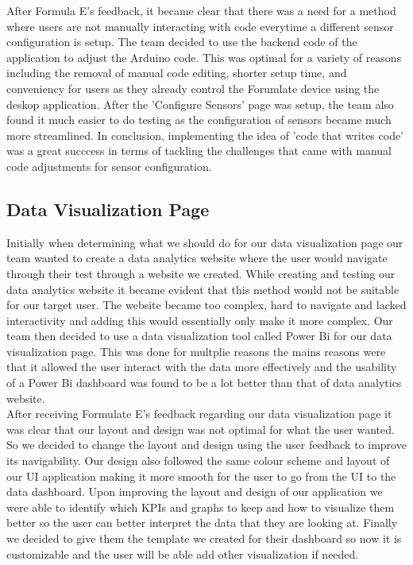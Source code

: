 \documentclass[12pt,titlepage]{article}
\begin{document}
After Formula E's feedback, it became clear that there was a need for a method where users are not manually interacting with code everytime a different sensor 
configuration is setup. The team decided to use the backend code of the application to adjust the Arduino code. This was optimal for a variety of reasons including
the removal of manual code editing, shorter setup time, and conveniency for users as they already control the Forumlate device using the deskop application. After the
'Configure Sensors' page was setup, the team also found it much easier to do testing as the configuration of sensors became much more streamlined. In conclusion,
implementing the idea of 'code that writes code' was a great succcess in terms of tackling the challenges that came with manual code adjustments for sensor configuration.

\subsection{Data Visualization Page}

Initially when determining what we should do for our data visualization page our team wanted to create a data analytics website where the user would navigate through their test through a website we created. While creating and testing our data analytics website it became evident that this method would not be suitable for our target user. The website became too complex, hard to navigate and lacked interactivity and adding this would essentially only make it more complex. Our team then decided to use a data visualization tool called Power Bi for our data visualization page. This was done for multplie reasons the mains reasons were that it allowed the user interact with the data more effectively and the usability of a Power Bi dashboard was found to be a lot better than that of data analytics website.\\

After receiving Formulate E's feedback regarding our data visualization page it was clear that our layout and design was not optimal for what the user wanted. So we decided to change the layout and design using the user feedback to improve its navigability. Our design also followed the same colour scheme and layout of our UI application making it more smooth for the user to go from the UI to the data dashboard. Upon improving the layout and design of our application we were able to identify which KPIs and graphs to keep and how to visualize them better so the user can better interpret the data that they are looking at. Finally we decided to give them the template we created for their dashboard so now it is customizable and the user will be able add other visualization if needed.\\
\end{document}
